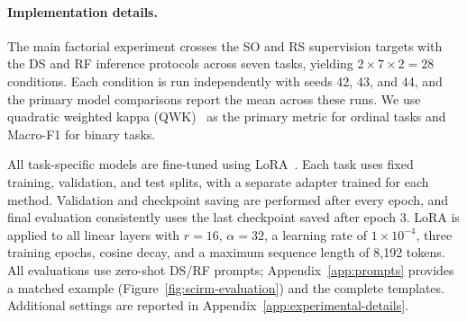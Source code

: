 \paragraph{Implementation details.}


The main factorial experiment crosses the SO and RS supervision
targets with the DS and RF inference protocols across seven tasks,
yielding \(2\times7\times2=28\) conditions. Each condition is run
independently with seeds 42, 43, and 44, and the primary model
comparisons report the mean across these runs.
We use quadratic weighted kappa
(QWK)~\citep{cohen-1968-weighted} as the primary metric for ordinal
tasks and Macro-F1 for binary tasks.


All task-specific models are fine-tuned using
LoRA~\citep{hu-etal-2022-lora}. Each task uses fixed training,
validation, and test splits, with a separate adapter trained for each
method. Validation and checkpoint saving are performed after every
epoch, and final evaluation consistently uses the last checkpoint saved after
epoch 3. LoRA is
applied to all linear layers with \(r=16\), \(\alpha=32\), a learning
rate of \(1\times10^{-4}\), three training epochs, cosine decay, and a
maximum sequence length of 8,192 tokens. All evaluations use zero-shot
DS/RF prompts; Appendix~\ref{app:prompts} provides a matched example
(Figure~\ref{fig:scirm-evaluation}) and the complete templates.
Additional settings are reported in
Appendix~\ref{app:experimental-details}.

